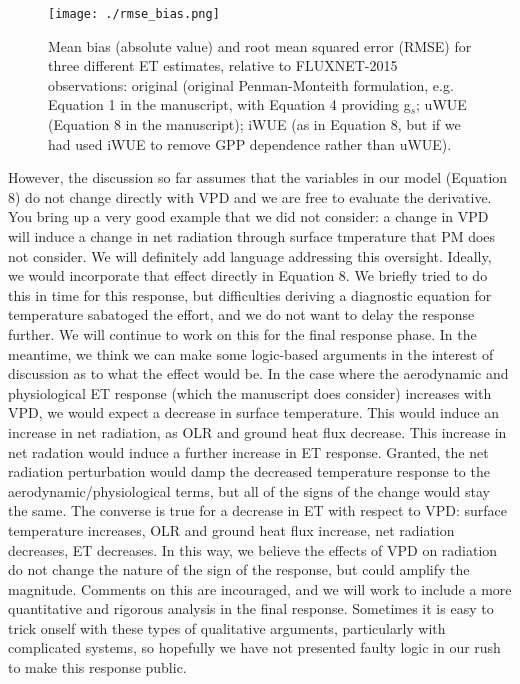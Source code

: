 \documentclass[12pt]{article}
\begin{document}
\begin{figure}[h]
  \centering \texttt{[image: ./rmse\_bias.png]}
  \caption{Mean bias (absolute value) and root mean squared error
    (RMSE) for three different ET estimates, relative to FLUXNET-2015
    observations: original (original Penman-Monteith formulation,
    e.g. Equation 1 in the manuscript, with Equation 4 providing
    g$_s$; uWUE (Equation 8 in the manuscript); iWUE (as in Equation
    8, but if we had used iWUE to remove GPP dependence rather than
    uWUE).}
  \label{rmse}
\end{figure}

However, the discussion so far assumes that the variables in our model
(Equation 8) do not change directly with VPD and we are free to
evaluate the derivative. You bring up a very good example that we did
not consider: a change in VPD will induce a change in net radiation
through surface tmperature that PM does not consider. We will
definitely add language addressing this oversight. Ideally, we would
incorporate that effect directly in Equation 8. We briefly tried to do
this in time for this response, but difficulties deriving a diagnostic
equation for temperature sabatoged the effort, and we do not want to
delay the response further. We will continue to work on this for the
final response phase. In the meantime, we think we can make some
logic-based arguments in the interest of discussion as to what the
effect would be. In the case where the aerodynamic and physiological
ET response (which the manuscript does consider) increases with VPD,
we would expect a decrease in surface temperature. This would induce
an increase in net radiation, as OLR and ground heat flux
decrease. This increase in net radation would induce a further
increase in ET response. Granted, the net radiation perturbation would
damp the decreased temperature response to the
aerodynamic/physiological terms, but all of the signs of the change
would stay the same. The converse is true for a decrease in ET with
respect to VPD: surface temperature increases, OLR and ground heat
flux increase, net radiation decreases, ET decreases. In this way, we
believe the effects of VPD on radiation do not change the nature of
the sign of the response, but could amplify the magnitude. Comments on
this are incouraged, and we will work to include a more quantitative
and rigorous analysis in the final response. Sometimes it is easy to
trick onself with these types of qualitative arguments, particularly
with complicated systems, so hopefully we have not presented faulty
logic in our rush to make this response public.
\end{document}
